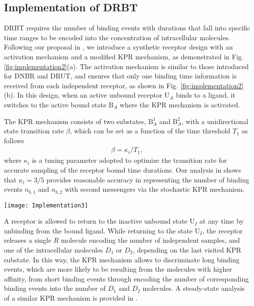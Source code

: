 \documentclass[twocolumn]{IEEEtran}
\newcommand{\B}{\mathrm{B}}
\newcommand{\U}{\mathrm{U}}
\begin{document}
\subsection{Implementation of DRBT}
DRBT requires the number of binding events with durations that fall into specific time ranges to be encoded into the concentration of intracellular molecules. Following our proposal in \cite{kuscu2019channel}, we introduce a synthetic receptor design with an activation mechanism and a modified KPR mechanism, as demonstrated in Fig. \ref{fig:implementation2}(a). The activation mechanism is similar to those introduced for DNBR and DRUT, and ensures that only one binding time information is received from each independent receptor, as shown in Fig. \ref{fig:implementation2}(b). In this design, when an active unbound receptor $\U_A$ binds to a ligand, it switches to the active bound state $\B_A$ where the KPR mechanism is activated. 


The KPR mechanism consists of two substates, $\B_A^1$ and $\B_A^2$, with a unidirectional state transition rate $\beta$, which can be set as a function of the time threshold $T_1$ as follows  
\begin{align}
\beta = \kappa_i/T_1 ,
\end{align}
where $\kappa_i$ is a tuning parameter adopted to optimize the transition rate for accurate sampling of the receptor bound time durations. Our analysis in \cite{kuscu2019channel} shows that $\kappa_i = 3/5$ provides reasonable accuracy in representing the number of binding events $n_{b,1}$ and $n_{b,2}$ with second messengers via the stochastic KPR mechanism.
\begin{figure*}[!t]
	\centering
	\texttt{[image: Implementation3]}
	\caption{(a) Receptor design for DRBT. (b) Sampling of the number of binding events of durations within specific time intervals. (c) Receptor design for DRUBT. (d) Sampling of the receptor unbound time intervals and the number of binding events of durations within specific time intervals. }
	\label{fig:implementation2}
\end{figure*}

A receptor is allowed to return to the inactive unbound state $\U_I$ at any time by unbinding from the bound ligand. While returning to the state $\U_I$, the receptor releases a single $R$ molecule encoding the number of independent samples, and one of the intracellular molecules $D_1$ or $D_2$, depending on the last visited KPR substate. In this way, the KPR mechanism allows to discriminate long binding events, which are more likely to be resulting from the molecules with higher affinity, from short binding events through encoding the number of corresponding binding events into the number of $D_1$ and $D_2$ molecules. A steady-state analysis of a similar KPR mechanism is provided in \cite{kuscu2019channel}. 
\end{document}
